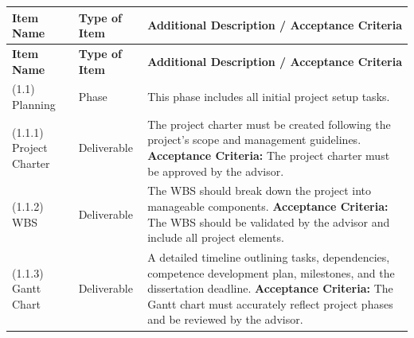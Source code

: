 \begin{longtable}{|p{3cm}|p{2.5cm}|p{8cm}|}
      \hline
      \textbf{Item Name}             & \textbf{Type of Item} & \textbf{Additional Description / Acceptance Criteria}                                                                                                                                                                                                                                                                                                     \\ \hline
      \endfirsthead
      \hline
      \textbf{Item Name}             & \textbf{Type of Item} & \textbf{Additional Description / Acceptance Criteria}                                                                                                                                                                                                                                                                                                     \\ \hline
      \endhead
      (1.1) Planning                 & Phase                 & This phase includes all initial project setup tasks.                                                                                                                                                                                                                                                                                                      \\ \hline
      (1.1.1) Project Charter        & Deliverable           & The project charter must be created following the project's scope and management guidelines. \newline \textbf{Acceptance Criteria:} The project charter must be approved by the advisor.                                                                                                                                                                  \\ \hline
      (1.1.2) \gls{WBS}              & Deliverable           & The \gls{WBS} should break down the project into manageable components. \newline \textbf{Acceptance Criteria:} The WBS should be validated by the advisor and include all project elements.                                                                                                                                                               \\ \hline
      (1.1.3) Gantt Chart            & Deliverable           & A detailed timeline outlining tasks, dependencies, competence development plan, milestones, and the dissertation deadline. \newline \textbf{Acceptance Criteria:} The Gantt chart must accurately reflect project phases and be reviewed by the advisor.                                                                                                  \\ \hline
      \hline %


\end{longtable}

